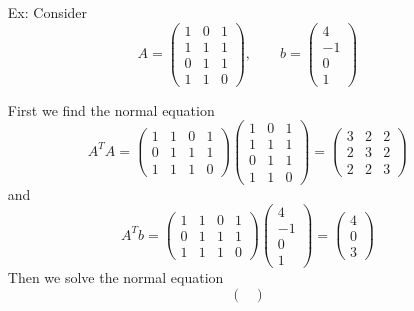 \documentclass[reqno]{amsart}
\theoremstyle{definition}
\begin{document}
\begin{itemize}
\item[Ex:  ]  Consider
%
\begin{equation*}
A = \begin{pmatrix}
1 & 0 & 1\\
1& 1 & 1\\
0 & 1 & 1\\
1 & 1 & 0
\end{pmatrix},\qquad b = \begin{pmatrix}
4\\
-1\\
0\\
1
\end{pmatrix}
\end{equation*}

First we find the normal equation
%
\begin{equation*}
A^TA = \begin{pmatrix}
1 & 1 & 0 & 1\\
0 & 1 & 1 & 1\\
1 & 1 & 1 & 0
\end{pmatrix} \begin{pmatrix}
1 & 0 & 1\\
1 & 1 & 1\\
0 & 1 & 1\\
1 & 1 & 0
\end{pmatrix} = \begin{pmatrix}
3 & 2 & 2\\
2 & 3 & 2\\
2 & 2 & 3
\end{pmatrix}
\end{equation*}
%
and
%
\begin{equation*}
A^Tb = \begin{pmatrix}
1 & 1 & 0 & 1\\
0 & 1 & 1 & 1\\
1 & 1 & 1 & 0
\end{pmatrix} \begin{pmatrix}
4\\
-1\\
0\\
1
\end{pmatrix} = \begin{pmatrix}
4\\
0\\
3
\end{pmatrix}
\end{equation*}
%
Then we solve the normal equation
%
\begin{equation*}
\begin{pmatrix}

\end{pmatrix}
\end{equation*}
\end{itemize}
\end{document}
